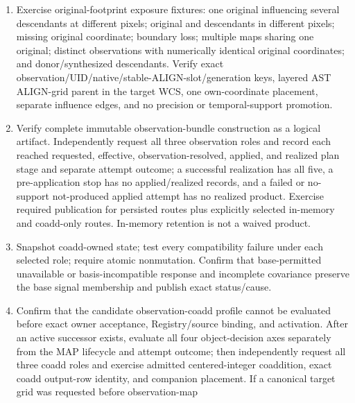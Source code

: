\documentclass[10pt]{article}
\begin{document}
\begin{enumerate}
membership only after Stages A--C and perform no payload arithmetic until all
required gates pass. Verify no numeric-zero mask, late masking, or aggregate
sanitization substitutes for admission. Then compare exact scientific
output-row identity and cardinality, plus
one-pixel, one-hot half-open-boundary, prohibited-fractional, empty-support,
covariance,
fixed-state response, full-procedure comparison-space typing, and distinct-fact
observation outputs, to independent expected values; retained storage rows do
not count as scientific output rows.
\item Exercise original-footprint exposure fixtures: one original influencing
several descendants at different pixels; original and descendants in
different pixels; missing original coordinate; boundary loss; multiple maps
sharing one original; distinct observations with numerically identical
original coordinates; and donor/synthesized descendants. Verify exact
observation/UID/native/stable-ALIGN-slot/generation keys, layered AST
ALIGN-grid parent in the target WCS, one own-coordinate placement, separate
influence edges, and no precision or temporal-support promotion.
\item Verify complete immutable observation-bundle construction as a logical
artifact. Independently request all three observation roles and record each
reached requested, effective, observation-resolved, applied, and realized plan
stage and separate attempt outcome; a successful realization has all five, a
pre-application stop has no applied/realized records, and a failed or
no-support not-produced applied attempt has no realized product. Exercise
required publication for persisted routes plus explicitly selected in-memory
and coadd-only routes.  In-memory retention is not a waived product.
\item Snapshot coadd-owned state; test every compatibility failure under each
selected role; require atomic nonmutation. Confirm that base-permitted
unavailable or basis-incompatible response and incomplete covariance preserve
the base signal membership and publish exact status/cause.
\item Confirm that the candidate observation-coadd profile cannot be evaluated
before exact owner acceptance, Registry/source binding, and activation. After
an active successor exists, evaluate all four object-decision axes separately
from the MAP lifecycle and attempt outcome; then independently request all
three coadd roles and exercise admitted
centered-integer coaddition, exact coadd output-row identity, and companion
placement.  If a canonical target grid was requested before observation-map

\end{enumerate}
\end{document}
